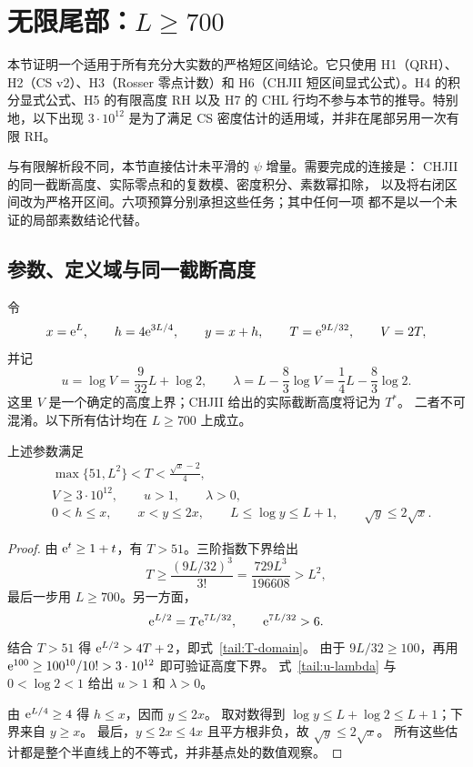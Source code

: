 \section{无限尾部：\texorpdfstring{$L\geq700$}{L>=700}}
\label{sec:tail}

本节证明一个适用于所有充分大实数的严格短区间结论。它只使用
H1（QRH）、H2（CS v2）、H3（Rosser 零点计数）和 H6（CHJII
短区间显式公式）。H4 的积分显式公式、H5 的有限高度 RH 以及 H7
的 CHL 行均不参与本节的推导。特别地，以下出现
$3\cdot10^{12}$ 是为了满足 CS 密度估计的适用域，并非在尾部另用一次有限 RH。

与有限解析段不同，本节直接估计未平滑的 $\psi$ 增量。需要完成的连接是：
CHJII 的同一截断高度、实际零点和的复数模、密度积分、素数幂扣除，
以及将右闭区间改为严格开区间。六项预算分别承担这些任务；其中任何一项
都不是以一个未证的局部素数结论代替。

\subsection{参数、定义域与同一截断高度}

令
\begin{equation}\label{tail:parameters}
 x=\mathrm e^L,\qquad h=4\mathrm e^{3L/4},\qquad y=x+h,\qquad
 T=\mathrm e^{9L/32},\qquad V=2T,
\end{equation}
并记
\begin{equation}\label{tail:u-lambda}
 u=\log V=\frac9{32}L+\log2,\qquad
 \lambda=L-\frac83\log V=\frac14L-\frac83\log2.
\end{equation}
这里 $V$ 是一个确定的高度上界；CHJII 给出的实际截断高度将记为 $T^*$。
二者不可混淆。以下所有估计均在 $L\geq700$ 上成立。

\begin{lemma}[尾部参数的合法性]\label{tail:domain}
上述参数满足
\begin{align}
 &\max\{51,L^2\}<T<\frac{\sqrt{x}-2}{4},\label{tail:T-domain}\\
 &V\geq3\cdot10^{12},\qquad u>1,\qquad \lambda>0,\label{tail:density-domain}\\
 &0<h\leq x,\qquad x<y\leq2x,\qquad
 L\leq\log y\leq L+1,\qquad \sqrt y\leq2\sqrt x.
 \label{tail:elementary-domain}
\end{align}
\end{lemma}

\begin{proof}
由 $\mathrm e^t\geq1+t$，有 $T>51$。三阶指数下界给出
\[
 T\geq\frac{(9L/32)^3}{3!}
 =\frac{729L^3}{196608}>L^2,
\]
最后一步用 $L\geq700$。另一方面，
\[
 \mathrm e^{L/2}=T\mathrm e^{7L/32},\qquad \mathrm e^{7L/32}>6.
\]
结合 $T>51$ 得 $\mathrm e^{L/2}>4T+2$，即式~\eqref{tail:T-domain}。
由于 $9L/32\geq100$，再用
$\mathrm e^{100}\geq100^{10}/10!>3\cdot10^{12}$ 即可验证高度下界。
式~\eqref{tail:u-lambda} 与 $0<\log2<1$ 给出 $u>1$ 和 $\lambda>0$。

由 $\mathrm e^{L/4}\geq4$ 得 $h\leq x$，因而 $y\leq2x$。
取对数得到 $\log y\leq L+\log2\leq L+1$；下界来自 $y\geq x$。
最后，$y\leq2x\leq4x$ 且平方根非负，故 $\sqrt y\leq2\sqrt x$。
所有这些估计都是整个半直线上的不等式，并非基点处的数值观察。
\end{proof}

